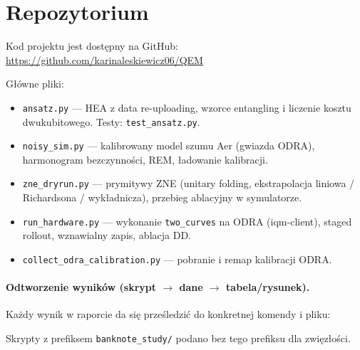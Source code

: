 \documentclass[11pt,a4paper]{article}
\begin{document}
\section{Repozytorium}

Kod projektu jest dostępny na GitHub:
\url{https://github.com/karinaleskiewicz06/QEM}

\medskip
\noindent Główne pliki:

\begin{itemize}
\item \texttt{ansatz.py} --- HEA z data re-uploading, wzorce entangling i liczenie
      kosztu dwukubitowego. Testy: \texttt{test\_ansatz.py}.
\item \texttt{noisy\_sim.py} --- kalibrowany model szumu Aer (gwiazda ODRA), harmonogram
      bezczynności, REM, ładowanie kalibracji.
\item \texttt{zne\_dryrun.py} --- prymitywy ZNE (unitary folding, ekstrapolacja
      liniowa / Richardsona / wykładnicza), przebieg ablacyjny w symulatorze.
\item \texttt{run\_hardware.py} --- wykonanie \texttt{two\_curves} na ODRA (iqm-client),
      staged rollout, wznawialny zapis, ablacja DD.
\item \texttt{collect\_odra\_calibration.py} --- pobranie i remap kalibracji ODRA.
\end{itemize}

\paragraph{Odtworzenie wyników (skrypt $\to$ dane $\to$ tabela/rysunek).} Każdy wynik w
raporcie da się prześledzić do konkretnej komendy i pliku:

Skrypty z prefiksem \texttt{banknote\_study/} podano bez tego prefiksu dla zwięzłości.
\end{document}
